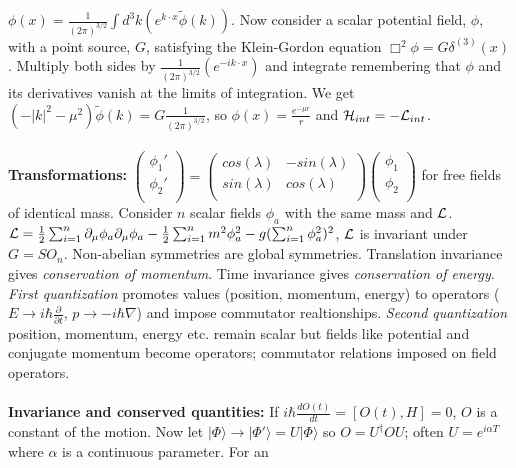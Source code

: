 ${\phi}(x)= {\frac 1 {(2 \pi)^{3/2}}} \int d^3 k (e^{k \cdot x} \tilde{\phi}(k))$.
Now consider a scalar potential field, $\phi$, with a point source, $G$, satisfying the Klein-Gordon equation
$\Box^2 \phi = G \delta^{(3)}(x)$.  Multiply both sides by
${\frac 1 {(2 \pi)^{3/2}}} (e^{- i k \cdot x})$ 
and integrate remembering that $\phi$ and its derivatives
vanish at the limits of integration.  We get $(-|k|^2-\mu^2) \tilde{\phi}(k)= G {\frac 1 {(2 \pi)^{3/2}}}$,
so $\phi(x)= {\frac {e^{- \mu r}} r}$ and ${\cal H}_{int}= - {\cal L}_{int}$.
\\
\\
{\bf Transformations:}
$
\left(
\begin{array}{c}
\phi_1' \\
\phi_2' \\
\end{array}
\right)
=
\left(
\begin{array}{cc}
cos(\lambda) & - sin(\lambda)\\
sin(\lambda) &  cos(\lambda)\\
\end{array}
\right)
\left(
\begin{array}{c}
\phi_1 \\
\phi_2 \\
\end{array}
\right)
$ for free fields of identical mass.
Consider $n$ scalar fields $\phi_a$ with the same mass and ${\cal L}$.
${\cal L}= {\frac 1 2} \sum_{i=1}^n \partial_{\mu} \phi_a \partial_{\mu} \phi_a - {\frac 1 2} \sum_{i=1}^n
m^2 \phi_a^2 - g (\sum_{i=1}^n \phi_a^2)^2$,  ${\cal L}$ is invariant under $G= SO_n$.  Non-abelian symmetries
are global symmetries.
Translation invariance gives \emph{conservation of momentum}.
Time invariance gives \emph{conservation of energy}.
\emph{First quantization} promotes values (position, momentum, energy) to operators 
($E \rightarrow i \hbar {\frac {\partial}{\partial t}}$,
$p \rightarrow -i \hbar \nabla$) and impose commutator realtionships.
\emph{Second quantization} position, momentum, energy etc. remain scalar but
fields like potential and conjugate momentum become operators; commutator relations imposed on field operators.
\\
\\
{\bf Invariance and conserved quantities:}  
If $i \hbar {\frac {d O(t)}{dt}}= [O(t),H]=0$, $O$ is a constant of the motion.   Now let
$|\Phi\rangle \rightarrow |\Phi'\rangle= U |\Phi\rangle$ so
$O= U^{\dagger} O U$; often $U= e^{i \alpha T}$ where $\alpha$ is a continuous parameter.  For an
